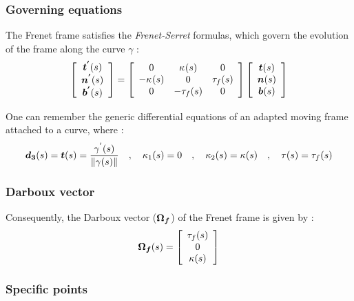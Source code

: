 \subsubsection{Governing equations}
The Frenet frame satisfies the \emph{Frenet-Serret} formulas, which govern the evolution of the frame along the curve $\gamma$ :
\begin{gather}
\left[\begin{array}{c}
\boldsymbol{t^{'}}(s) \\
\boldsymbol{n^{'}}(s) \\
\boldsymbol{b^{'}}(s)
\end{array}\right]
=
\left[\begin{array}{ccc}
0 & \kappa_{}(s) & 0 \\
-\kappa_{}(s) & 0 & \tau_f(s) \\
0 & -\tau_f(s) & 0
\end{array}\right]
\left[\begin{array}{c}
\boldsymbol{t}(s) \\
\boldsymbol{n}(s) \\
\boldsymbol{b}(s)
\end{array}\right]
\end{gather}

One can remember the generic differential equations of an adapted moving frame attached to a curve, where : 
\begin{gather}
\boldsymbol{d_{3}}(s) = \boldsymbol{t}(s) = \frac{\gamma^{'}(s)}{\|\gamma(s)\|}
\quad,\quad
\kappa_{1}(s) = 0
\quad,\quad
\kappa_{2}(s) = \kappa(s)
\quad,\quad
\tau(s) = \tau_{f}(s)
\end{gather}



\subsubsection{Darboux vector}
Consequently, the Darboux vector ($\boldsymbol{\Omega_{f}}$) of the Frenet frame is given by :
\begin{gather}
\boldsymbol{\Omega_f}(s) 
= 
\left[\begin{array}{c}
\tau_{f}(s) \\
0 \\
\kappa(s)
\end{array}\right]
\end{gather}


\subsubsection{Specific points}

